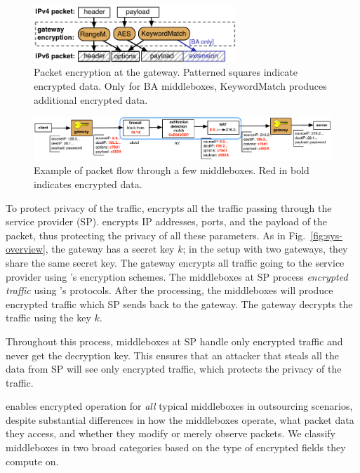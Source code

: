 \begin{figure}[t!]
\centering
  \includegraphics[width=3.0in]{fig/packet.pdf}
\caption{Packet encryption at the gateway. Patterned squares indicate encrypted data. Only for BA  middleboxes,  KeywordMatch produces additional encrypted data.  \label{fig:packet}}
\end{figure}





\begin{figure}[t!]
\centering
  \includegraphics[width=6.7in]{fig/packetpath.pdf}
\caption{Example of packet flow through a few middleboxes. Red in bold indicates encrypted data. \label{fig:packetflow}}
\end{figure}



To protect privacy of the traffic, \sys encrypts all the traffic passing through the service provider (SP).
\sys encrypts IP addresses, ports, and the payload of the packet, thus protecting the privacy of all these parameters. 
As in Fig.~\ref{fig:sys-overview}, the gateway has a secret key $k$; in the setup with two gateways, they share
the same secret key. The gateway encrypts all traffic going to the service provider using \sys's encryption schemes.
The middleboxes at SP process {\em encrypted traffic} using \sys's protocols. 
After the processing, the middleboxes
will produce encrypted traffic which SP sends back to the gateway. The gateway decrypts the traffic using the key $k$.

Throughout this process, middleboxes at SP handle only encrypted traffic and never get the decryption key. This ensures
that an attacker that steals all the data from SP will  see only encrypted traffic, which protects the privacy of the 
traffic. 



 \sys enables encrypted operation for {\em all} typical middleboxes in outsourcing scenarios, despite substantial differences in how the middleboxes operate, what packet data they access, and whether they modify or merely observe packets.
  We classify middleboxes in  two broad categories based on the type of encrypted fields  they compute on.

